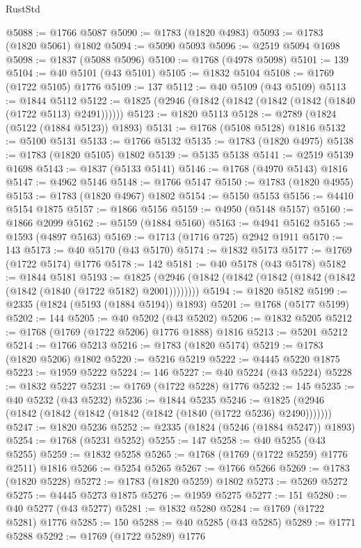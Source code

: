 \begin{lexlean}{RustStd}
\begin{coremodule}
@5088 := @1766 @5087
@5090 := @1783 (@1820 @4983)
@5093 := @1783 (@1820 @5061) @1802
@5094 := @5090 @5093
@5096 := @2519 @5094 @1698
@5098 := @1837 (@5088 @5096)
@5100 := @1768 (@4978 @5098)
@5101 := 139
@5104 := @40 @5101 (@43 @5101)
@5105 := @1832 @5104
@5108 := @1769 (@1722 @5105) @1776
@5109 := 137
@5112 := @40 @5109 (@43 @5109)
@5113 := @1844 @5112
@5122 := @1825 (@2946 (@1842 (@1842 (@1842 (@1842 (@1840 (@1722 @5113) @2491))))))
@5123 := @1820 @5113
@5128 := @2789 (@1824 (@5122 (@1884 @5123)) @1893)
@5131 := @1768 (@5108 @5128) @1816
@5132 := @5100 @5131
@5133 := @1766 @5132
@5135 := @1783 (@1820 @4975)
@5138 := @1783 (@1820 @5105) @1802
@5139 := @5135 @5138
@5141 := @2519 @5139 @1698
@5143 := @1837 (@5133 @5141)
@5146 := @1768 (@4970 @5143) @1816
@5147 := @4962 @5146
@5148 := @1766 @5147
@5150 := @1783 (@1820 @4955)
@5153 := @1783 (@1820 @4967) @1802
@5154 := @5150 @5153
@5156 := @4410 @5154 @1875
@5157 := @1866 @5156
@5159 := @4950 (@5148 @5157)
@5160 := @1866 @2099
@5162 := @5159 (@1884 @5160)
@5163 := @4941 @5162
@5165 := @1593 (@4897 @5163)
@5169 := @1713 (@1716 @725) @2942 @1911
@5170 := 143
@5173 := @40 @5170 (@43 @5170)
@5174 := @1832 @5173
@5177 := @1769 (@1722 @5174) @1776
@5178 := 142
@5181 := @40 @5178 (@43 @5178)
@5182 := @1844 @5181
@5193 := @1825 (@2946 (@1842 (@1842 (@1842 (@1842 (@1842 (@1842 (@1840 (@1722 @5182) @2001))))))))
@5194 := @1820 @5182
@5199 := @2335 (@1824 (@5193 (@1884 @5194)) @1893)
@5201 := @1768 (@5177 @5199)
@5202 := 144
@5205 := @40 @5202 (@43 @5202)
@5206 := @1832 @5205
@5212 := @1768 (@1769 (@1722 @5206) @1776 @1888) @1816
@5213 := @5201 @5212
@5214 := @1766 @5213
@5216 := @1783 (@1820 @5174)
@5219 := @1783 (@1820 @5206) @1802
@5220 := @5216 @5219
@5222 := @4445 @5220 @1875
@5223 := @1959 @5222
@5224 := 146
@5227 := @40 @5224 (@43 @5224)
@5228 := @1832 @5227
@5231 := @1769 (@1722 @5228) @1776
@5232 := 145
@5235 := @40 @5232 (@43 @5232)
@5236 := @1844 @5235
@5246 := @1825 (@2946 (@1842 (@1842 (@1842 (@1842 (@1842 (@1840 (@1722 @5236) @2490)))))))
@5247 := @1820 @5236
@5252 := @2335 (@1824 (@5246 (@1884 @5247)) @1893)
@5254 := @1768 (@5231 @5252)
@5255 := 147
@5258 := @40 @5255 (@43 @5255)
@5259 := @1832 @5258
@5265 := @1768 (@1769 (@1722 @5259) @1776 @2511) @1816
@5266 := @5254 @5265
@5267 := @1766 @5266
@5269 := @1783 (@1820 @5228)
@5272 := @1783 (@1820 @5259) @1802
@5273 := @5269 @5272
@5275 := @4445 @5273 @1875
@5276 := @1959 @5275
@5277 := 151
@5280 := @40 @5277 (@43 @5277)
@5281 := @1832 @5280
@5284 := @1769 (@1722 @5281) @1776
@5285 := 150
@5288 := @40 @5285 (@43 @5285)
@5289 := @1771 @5288
@5292 := @1769 (@1722 @5289) @1776

\end{coremodule}
\end{lexlean}
